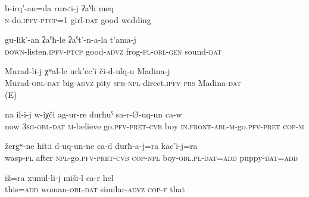 \begin{enumerate}
\begin{exe}
		\ex	\label{ex:(I) will make a big weeding for my daughter}
		\gll	b-irq'-an=da	rursːi-j	ʡaˁħ	meq \\
			\textsc{n}-do.\textsc{ipfv}-\textsc{ptcp}=1	girl-\textsc{dat}	good	wedding\\
		\glt	{}
		
		\ex	\label{ex:listening carefully to the sounds of the frogs}
		\gll	gu-lik'-an	ʡaˁħ-le	ʡaˁt'-n-a-la	t'ama-j\\
			\textsc{down}-listen.\textsc{ipfv}-\textsc{ptcp}	good-\textsc{advz}	frog-\textsc{pl}-\textsc{obl}-\textsc{gen}	sound-\textsc{dat}\\
		\glt	{}
		
		\ex	\label{ex:Murad feels very sorry for Madina}
		\gll	Murad-li-j	χʷal-le		urk'ec'i	či-d-ulq-u	Madina-j \\
			Murad-\textsc{obl}-\textsc{dat}		big-\textsc{advz}	pity	\textsc{spr}-\textsc{npl}-direct.\textsc{ipfv}-\textsc{prs}	Madina-\textsc{dat}\\
		\glt	{} (E)
		
		\ex	\label{ex:Now the boy believed it (=the mouse) and ran away}
		\gll	na	il-i-j	w-iχči	ag-ur-re	durħuˁ	sa-r-Ø-uq-un ca-w\\
			now	3\textsc{sg}-\textsc{obl}-\textsc{dat}	\textsc{m}-believe	go.\textsc{pfv}-\textsc{pret}-\textsc{cvb}	boy	\textsc{in.front}-\textsc{abl}-\textsc{m}-go.\textsc{pfv}-\textsc{pret} \textsc{cop-m}\\
		\glt	{}
		
		\ex	\label{ex:The wasps flew after the boy and the puppy}
		\gll	žergʷ-ne	hitːi	d-uq-un-ne ca-d	durħ-a-j=ra	kac'i-j=ra \\
			wasp-\textsc{pl} after \textsc{npl}-go.\textsc{pfv}-\textsc{pret}-\textsc{cvb} \textsc{cop-npl}	boy-\textsc{obl}.\textsc{pl}-\textsc{dat}=\textsc{add}	puppy-\textsc{dat}=\textsc{add}\\
		\glt	{}
	
		\ex	\label{ex:This also (=the person on a picture) one resembles a woman}
		\gll	iž=ra	xunul-li-j	miši-l	ca-r	hel\\
			this=\textsc{add}	woman-\textsc{obl}-\textsc{dat}	similar-\textsc{advz}	\textsc{cop-f}	that\\
		\glt	{}
	\end{exe}


\end{enumerate}
